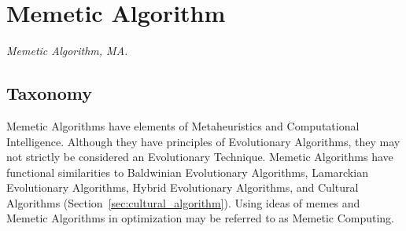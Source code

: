 

\section{Memetic Algorithm} 
\label{sec:memetic_algorithm}

\emph{Memetic Algorithm, MA.}

\subsection{Taxonomy}
Memetic Algorithms have elements of Metaheuristics and Computational Intelligence. Although they have principles of Evolutionary Algorithms, they may not strictly be considered an Evolutionary Technique.
Memetic Algorithms have functional similarities to Baldwinian Evolutionary Algorithms, Lamarckian Evolutionary Algorithms, Hybrid Evolutionary Algorithms, and Cultural Algorithms (Section~\ref{sec:cultural_algorithm}). Using ideas of memes and Memetic Algorithms in optimization may be referred to as Memetic Computing.

